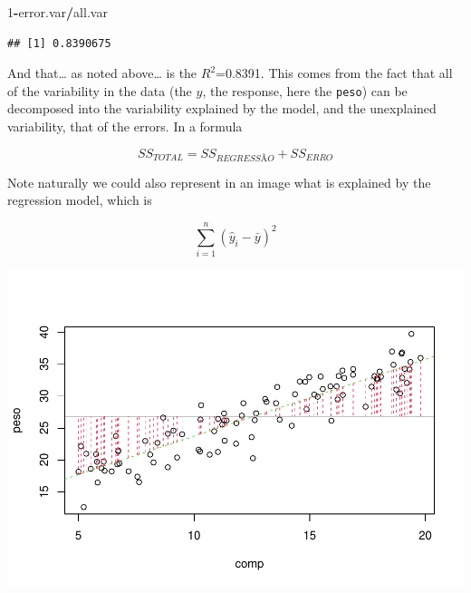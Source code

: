 \documentclass[
]{book}
\newenvironment{Shaded}{\begin{snugshade}}{\end{snugshade}}
\newcommand{\AttributeTok}[1]{\textcolor[rgb]{0.13,0.29,0.53}{#1}}
\newcommand{\CommentTok}[1]{\textcolor[rgb]{0.56,0.35,0.01}{\textit{#1}}}
\newcommand{\DecValTok}[1]{\textcolor[rgb]{0.00,0.00,0.81}{#1}}
\newcommand{\FunctionTok}[1]{\textcolor[rgb]{0.13,0.29,0.53}{\textbf{#1}}}
\newcommand{\NormalTok}[1]{#1}
\newcommand{\SpecialCharTok}[1]{\textcolor[rgb]{0.81,0.36,0.00}{\textbf{#1}}}
\begin{document}
\begin{Shaded}
\begin{Highlighting}[]
\DecValTok{1}\SpecialCharTok{{-}}\NormalTok{error.var}\SpecialCharTok{/}\NormalTok{all.var}
\end{Highlighting}
\end{Shaded}

\begin{verbatim}
## [1] 0.8390675
\end{verbatim}

And that\ldots{} as noted above\ldots{} is the \(R^2\)=0.8391. This comes from the fact that all of the variability in the data (the \(y\), the response, here the \texttt{peso}) can be decomposed into the variability explained by the model, and the unexplained variability, that of the errors. In a formula

\[SS_{TOTAL}=SS_{REGRESSÃO}+SS_{ERRO}\]

Note naturally we could also represent in an image what is explained by the regression model, which is

\[\sum_{i=1}^n (\hat y_i- \bar y)^2\]

\begin{Shaded}
\end{Shaded}

\includegraphics{ECOMODbook_files/figure-latex/a6.18-1.pdf}
\end{document}
